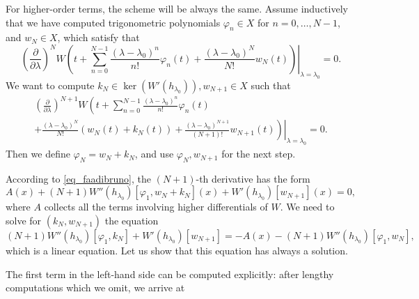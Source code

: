 \documentclass{amsart}
\begin{document}
For higher-order terms, the scheme will be always the same.
Assume inductively that we have computed trigonometric polynomials $\varphi_n \in X$ for $n = 0, \ldots, N-1$, and $w_N \in X$, which satisfy that
\[
	\left.\left(\frac\partial{\partial \lambda} \right)^N W\left( t + \sum_{n=0}^{N-1} \frac {(\lambda-\lambda_0)^n}{n!} \varphi_n(t) + \frac {(\lambda-\lambda_0)^N}{N!} w_N(t) \right) \right|_{\lambda=\lambda_0} = 0.
\]
We want to compute $k_N \in \ker(W'(h_{\lambda_0})), w_{N+1} \in X$ such that
\begin{multline}
	\left. \left(\frac\partial{\partial \lambda} \right)^{N+1} W\left( t +\sum_{n=0}^{N-1} \frac {(\lambda-\lambda_0)^n}{n!} \varphi_n(t) \right.\right. \\ \left. \left. + \frac {(\lambda-\lambda_0)^N}{N!} (w_N(t) + k_N(t)) + \frac {(\lambda-\lambda_0)^{N+1}}{(N+1)!} w_{N+1}(t) \right) \right|_{\lambda=\lambda_0} = 0.
\end{multline}
Then we define $\varphi_N = w_N + k_N$, and use $\varphi_N, w_{N+1}$ for the next step.

According to \eqref{eq_faadibruno}, the $(N+1)$-th derivative has the form
\[ A(x) + (N+1) W''(h_{\lambda_0})[\varphi_1, w_N + k_N](x) + W'(h_{\lambda_0})[w_{N+1}](x) = 0,\]
where $A$ collects all the terms involving higher differentials of $W$.
We need to solve for $(k_N, w_{N+1})$ the equation
\begin{equation}
	\label{eq_stepN}
	(N+1) W''(h_{\lambda_0})[\varphi_1, k_N] + W'(h_{\lambda_0})[w_{N+1}] = - A(x) - (N+1) W''(h_{\lambda_0})[\varphi_1, w_N],
\end{equation}
which is a linear equation. Let us show that this equation has always a solution.

The first term in the left-hand side can be computed explicitly: after lengthy computations which we omit, we arrive at
\end{document}
